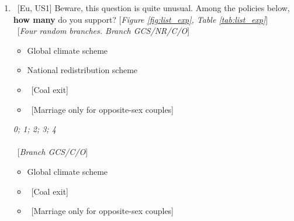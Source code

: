 \begin{enumerate}[resume]
\item ~[Eu, US1] \label{q:list_exp} Beware, this question is quite unusual. Among the policies below, \textbf{how many} do you support? [\textit{Figure \ref{fig:list_exp}, Table \ref{tab:list_exp}}]\\
~[\textit{Four random branches. Branch GCS/NR/C/O}] \\
\begin{itemize} \vspace{-1em}
    \item Global climate scheme 
    \item National redistribution scheme
    \item ~[Coal exit]  
    \item ~[Marriage only for opposite-sex couples]
\end{itemize}
\textit{0; 1; 2; 3; 4}\\
\\
~[\textit{Branch GCS/C/O}] \\
\begin{itemize}  \vspace{-1em}
    \item Global climate scheme 
    \item ~[Coal exit]  
    \item ~[Marriage only for opposite-sex couples]

\end{itemize}
\end{enumerate}
